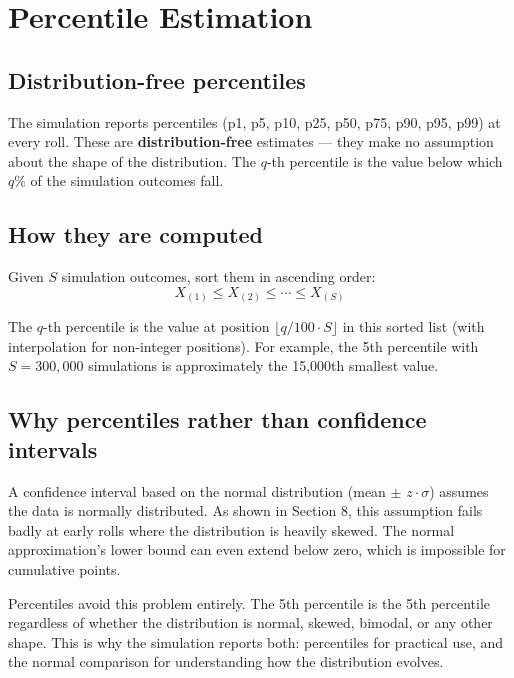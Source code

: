 \documentclass[11pt,a4paper]{article}
\theoremstyle{remark}
\begin{document}
\section{Percentile Estimation}

\subsection{Distribution-free percentiles}

The simulation reports percentiles (p1, p5, p10, p25, p50, p75, p90, p95, p99) at every roll. These are \textbf{distribution-free} estimates --- they make no assumption about the shape of the distribution. The $q$-th percentile is the value below which $q\%$ of the simulation outcomes fall.

\subsection{How they are computed}

Given $S$ simulation outcomes, sort them in ascending order:
\[
X_{(1)} \leq X_{(2)} \leq \cdots \leq X_{(S)}
\]

The $q$-th percentile is the value at position $\lfloor q/100 \cdot S \rfloor$ in this sorted list (with interpolation for non-integer positions). For example, the 5th percentile with $S = 300{,}000$ simulations is approximately the 15{,}000th smallest value.

\subsection{Why percentiles rather than confidence intervals}

A confidence interval based on the normal distribution (mean $\pm$ $z \cdot \sigma$) assumes the data is normally distributed. As shown in Section 8, this assumption fails badly at early rolls where the distribution is heavily skewed. The normal approximation's lower bound can even extend below zero, which is impossible for cumulative points.

Percentiles avoid this problem entirely. The 5th percentile is the 5th percentile regardless of whether the distribution is normal, skewed, bimodal, or any other shape. This is why the simulation reports both: percentiles for practical use, and the normal comparison for understanding how the distribution evolves.
\end{document}
